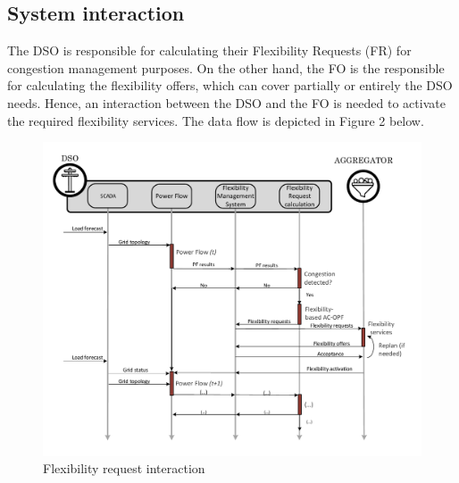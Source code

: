 
\subsection{System interaction}
The DSO is responsible for calculating their Flexibility Requests (FR) for congestion management purposes. On the other hand, the FO is the responsible for calculating the flexibility offers, which can cover partially or entirely the DSO needs. Hence, an interaction between the DSO and the FO is needed to activate the required flexibility services. The data flow is depicted in Figure 2 below.

\begin{figure}[h]
	\centering
	\includegraphics[width=1\columnwidth ]{ChapterOPF_DSO/Figures/OPF_interaction_ACOPF.pdf}
		\caption{Flexibility request interaction}
	\label{fig:pimodel}  
\end{figure}

